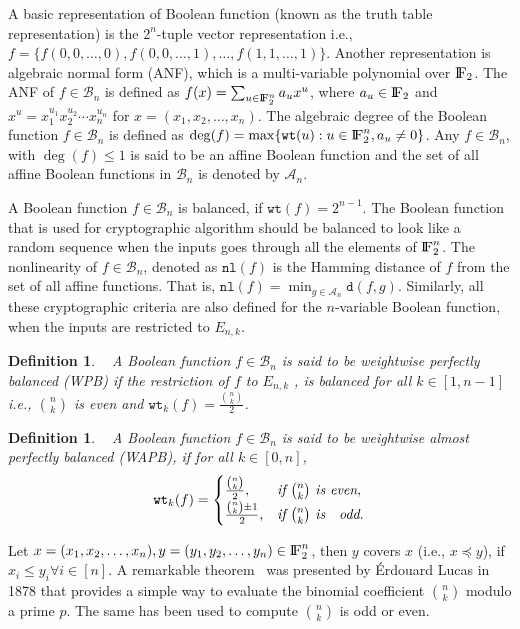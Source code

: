 \documentclass{article}[12pt]
\newtheorem{definition}[theorem]{Definition}
\newcommand{\FF}{{\rm I\!F}}
\newcommand{\CA}{\mathcal{A}}
\newcommand{\CB}{\mathcal{B}}
\newcommand{\wt}{\mathtt{wt}}
\newcommand{\nl}{\mathtt{nl}}
\newcommand{\ds}{\mathtt{d}}
\begin{document}
A basic representation of Boolean function (known as the truth table representation) is the $2^n$-tuple vector representation i.e., $f= \{f(0,0, \ldots, 0), f(0,0,\ldots,1), \ldots, f(1,1,\ldots,1)\}$. Another representation is algebraic normal form (ANF), which is a multi-variable polynomial over $\FF_2$. The ANF of $f \in \CB_n$ is defined as $f(x)= \sum_{u \in \FF_2^n}a_ux^u$, where $a_u \in \FF_2$ and $x^u=x_1^{u_1}x_2^{u_2} \cdots x_n^{u_n}$ for $x=(x_1,x_2, \ldots,x_n)$. The algebraic degree of the Boolean function $f \in \CB_n$ is defined as $\deg(f)=\max\{\wt(u) : u \in \FF_2^n, a_u \neq 0\}$. Any $f \in \CB_n$, with $ \deg(f) \leq 1$ is said to be an affine Boolean function and the set of all affine Boolean functions in $\CB_n$ is denoted by $\CA_n$.

A Boolean function $f \in \CB_n$ is balanced, if $\wt(f)=2^{n-1}$. The Boolean function that is used for cryptographic algorithm should be balanced to look like a random sequence when the inputs goes through all the elements of $\FF_2^n$. The nonlinearity of $f \in \CB_n$, denoted as $\nl(f)$ is the Hamming distance of $f$ from the set of all affine functions. That is, $\nl(f)= \min_{g \in \CA_n} \ds(f,g)$.
Similarly, all these cryptographic criteria are also defined for the $n$-variable Boolean function, when the inputs are restricted to $E_{n,k}$. 

\begin{definition}~\cite{CMR17}
A Boolean function $f \in \CB_n$ is said to be weightwise perfectly balanced (WPB) if the restriction of $f$ to $E_{n,k}$ , is balanced for all $k \in [1,n-1]$ i.e., ${n\choose k}$ is even and $\wt_k(f) = \frac{{n\choose k}}{2}$.
\end{definition}

\begin{definition}~\cite{CMR17}
A Boolean function $f \in \CB_n$ is said to be weightwise almost perfectly balanced (WAPB), if for all $k \in [0,n]$, 
\begin{equation*}
    \wt_k(f)=
    \begin{cases}
     \frac{{n\choose k}}{2}, & \textit{if } {n \choose k} \textit{ is even},\\
     \frac{{n \choose k}\pm 1}{2}, & \textit{if } {n \choose k} \textit{ is \; odd}.
    \end{cases}
\end{equation*}
\end{definition}

Let $x = (x_1, x_2,\ldots, x_n), y = (y_1, y_2, \ldots, y_n) \in \FF_2^n$, then $y$ covers $x$ (i.e., $ x \preceq y $), if $x_{i} \leq y_{i} \forall i \in [n]$. A remarkable theorem~\cite{L78} was presented by \'Erdouard Lucas in 1878  that provides a simple way to evaluate the binomial coefficient ${n \choose k}$ modulo a prime $p$. The same has been used to compute ${n \choose k}$ is odd or even.
\end{document}

